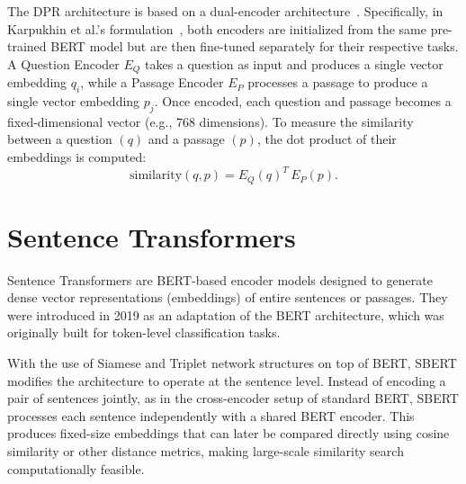The DPR architecture is based on a dual-encoder architecture~\cite{dualencoderarchitecture}. Specifically, in Karpukhin et al.'s formulation~\cite{densepassageretrievalopendomainkarpukhin2020}, both encoders are initialized from the same pre-trained BERT model but are then fine-tuned separately for their respective tasks. A Question Encoder \(E_Q\) takes a question as input and produces a single vector embedding \(q_i\), while a Passage Encoder \(E_P\) processes a passage to produce a single vector embedding \(p_j\). Once encoded, each question and passage becomes a fixed-dimensional vector (e.g., 768 dimensions). To measure the similarity between a question \((q)\) and a passage \((p)\), the dot product of their embeddings is computed:
\begin{equation}
    \label{eq:dot_sim}
    \text{similarity}(q, p) = E_Q(q)^T \, E_P(p).
\end{equation}

%


\section{Sentence Transformers}
\label{sec:Sentence-Transformers}
Sentence Transformers are BERT-based encoder models designed to generate dense vector representations (embeddings) of entire sentences or passages. 
They were introduced in 2019 \cite{reimers2019sentencebertsentenceembeddingsusing} as an adaptation of the BERT architecture, which was originally built for token-level classification tasks.

With the use of Siamese and Triplet network structures on top of BERT, SBERT modifies the architecture to operate at the sentence level. Instead of encoding a pair of sentences jointly, as in the cross-encoder setup of standard BERT, SBERT processes each sentence independently with a shared BERT encoder. This produces fixed-size embeddings that can later be compared directly using cosine similarity or other distance metrics, making large-scale similarity search computationally feasible.

